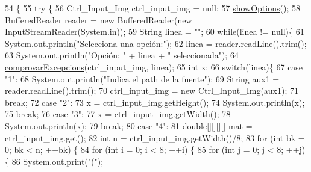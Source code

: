 \begin{DoxyCode}
54                                            \{
55     \textcolor{keywordflow}{try} \{
56         Ctrl\_Input\_Img ctrl\_input\_img = null;
57         \hyperlink{classpersistencia_1_1input_1_1Driver____Ctrl__Input__Img_a63892d1060c96a4478541bf0feff579d}{showOptions}();
58         BufferedReader reader = \textcolor{keyword}{new} BufferedReader(\textcolor{keyword}{new} InputStreamReader(System.in));
59         String linea = \textcolor{stringliteral}{""};
60         \textcolor{keywordflow}{while}(linea != null)\{
61             System.out.println(\textcolor{stringliteral}{"Selecciona una opción:"});
62             linea = reader.readLine().trim();
63             System.out.println(\textcolor{stringliteral}{"Opción: "} + linea + \textcolor{stringliteral}{" seleccionada"});
64             \hyperlink{classpersistencia_1_1input_1_1Driver____Ctrl__Input__Img_a60b4011cee02b5c7fc213230db46d6e0}{comprovarExcepcions}(ctrl\_input\_img, linea);
65             \textcolor{keywordtype}{int} x;
66             \textcolor{keywordflow}{switch}(linea)\{
67                 \textcolor{keywordflow}{case} \textcolor{stringliteral}{"1"}:
68                     System.out.println(\textcolor{stringliteral}{"Indica el path de la fuente"});
69                     String aux1 = reader.readLine().trim();
70                     ctrl\_input\_img = \textcolor{keyword}{new} Ctrl\_Input\_Img(aux1);
71                 \textcolor{keywordflow}{break};
72                 \textcolor{keywordflow}{case} \textcolor{stringliteral}{"2"}:
73                     x = ctrl\_input\_img.getHeight();
74                     System.out.println(x);
75                 \textcolor{keywordflow}{break};
76                 \textcolor{keywordflow}{case} \textcolor{stringliteral}{"3"}:
77                     x = ctrl\_input\_img.getWidth();
78                     System.out.println(x);
79                 \textcolor{keywordflow}{break};
80                 \textcolor{keywordflow}{case} \textcolor{stringliteral}{"4"}:
81                     \textcolor{keywordtype}{double}[][][][] mat = ctrl\_input\_img.get();
82                     \textcolor{keywordtype}{int} n = ctrl\_input\_img.getWidth()/8;
83                     \textcolor{keywordflow}{for} (\textcolor{keywordtype}{int} bk = 0; bk < n; ++bk) \{
84                         \textcolor{keywordflow}{for} (\textcolor{keywordtype}{int} i = 0; i < 8; ++i) \{
85                             \textcolor{keywordflow}{for} (\textcolor{keywordtype}{int} j = 0; j < 8; ++j) \{
86                                 System.out.print(\textcolor{stringliteral}{"("});

\end{DoxyCode}
